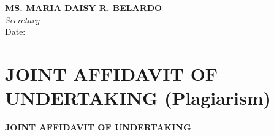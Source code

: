 \begin{theappendices}
\textbf{MS. MARIA DAISY R. BELARDO} \\
\textit{Secretary} \\


Date:\_\_\_\_\_\_\_\_\_\_\_\_\_\_\_\_\_\_\_\_\_\_\_

\chapter{JOINT AFFIDAVIT OF UNDERTAKING (Plagiarism)}

\centering

\textbf{JOINT AFFIDAVIT OF UNDERTAKING}




\end{theappendices}